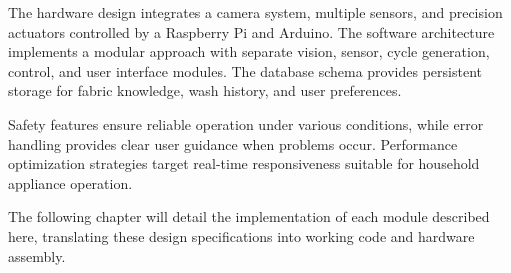 The hardware design integrates a camera system, multiple sensors, and precision actuators controlled by a Raspberry Pi and Arduino. The software architecture implements a modular approach with separate vision, sensor, cycle generation, control, and user interface modules. The database schema provides persistent storage for fabric knowledge, wash history, and user preferences.

Safety features ensure reliable operation under various conditions, while error handling provides clear user guidance when problems occur. Performance optimization strategies target real-time responsiveness suitable for household appliance operation.

The following chapter will detail the implementation of each module described here, translating these design specifications into working code and hardware assembly.